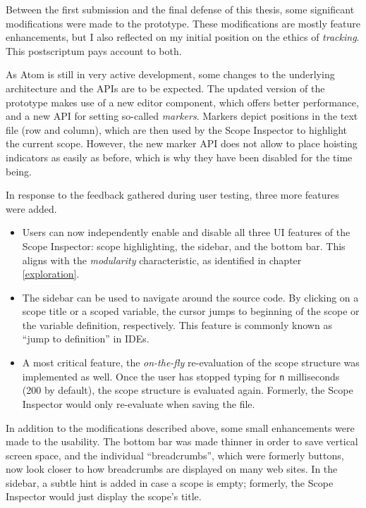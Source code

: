 Between the first submission and the final defense of this thesis, some
significant modifications were made to the prototype. These
modifications are mostly feature enhancements, but I also reflected on
my initial position on the ethics of \emph{tracking}. This postscriptum
pays account to both.

As Atom is still in very active development, some changes to the
underlying architecture and the APIs are to be expected. The updated
version of the prototype makes use of a new editor component, which
offers better performance, and a new API for setting so-called
\emph{markers}. Markers depict positions in the text file (row and
column), which are then used by the Scope Inspector to highlight the
current scope. However, the new marker API does not allow to place
hoisting indicators as easily as before, which is why they have been
disabled for the time being.

In response to the feedback gathered during user testing, three more
features were added.

\begin{itemize}
\itemsep1pt\parskip0pt
\item
  Users can now independently enable and disable all three UI features
  of the Scope Inspector: scope highlighting, the sidebar, and the
  bottom bar. This aligns with the \emph{modularity} characteristic, as
  identified in chapter \ref{exploration}.
\item
  The sidebar can be used to navigate around the source code. By
  clicking on a scope title or a scoped variable, the cursor jumps to
  beginning of the scope or the variable definition, respectively. This
  feature is commonly known as “jump to definition” in IDEs.
\item
  A most critical feature, the \emph{on-the-fly} re-evaluation of the
  scope structure was implemented as well. Once the user has stopped
  typing for \texttt{n} milliseconds (200 by default), the scope
  structure is evaluated again. Formerly, the Scope Inspector would only
  re-evaluate when saving the file.
\end{itemize}

In addition to the modifications described above, some small
enhancements were made to the usability. The bottom bar was made thinner
in order to save vertical screen space, and the individual
“breadcrumbs”, which were formerly buttons, now look closer to how
breadcrumbs are displayed on many web sites. In the sidebar, a subtle
hint is added in case a scope is empty; formerly, the Scope Inspector
would just display the scope’s title.

